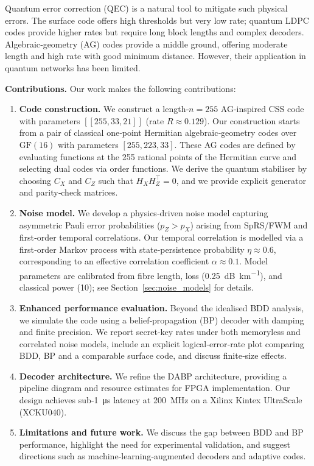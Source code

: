 \documentclass[conference]{IEEEtran}
\begin{document}
Quantum error correction (QEC) is a natural tool to mitigate such physical errors.  The surface code offers high thresholds but very low rate; quantum LDPC codes provide higher rates but require long block lengths and complex decoders.  Algebraic‑geometry (AG) codes provide a middle ground, offering moderate length and high rate with good minimum distance.  However, their application in quantum networks has been limited.

\textbf{Contributions.} Our work makes the following contributions:

\begin{enumerate}[leftmargin=*,itemsep=1pt,topsep=2pt]
  \item \textbf{Code construction.}  We construct a length‑$n=255$ AG‑inspired CSS code with parameters $[[255,33,21]]$ (rate $R\approx 0.129$).  Our construction starts from a pair of classical one‑point Hermitian algebraic‑geometry codes over $\mathrm{GF}(16)$ with parameters $[255,223,33]$.  These AG codes are defined by evaluating functions at the 255 rational points of the Hermitian curve and selecting dual codes via order functions.  We derive the quantum stabiliser by choosing $C_X$ and $C_Z$ such that $H_X H_Z^\top=0$, and we provide explicit generator and parity‑check matrices.
  \item \textbf{Noise model.}  We develop a physics‑driven noise model capturing asymmetric Pauli error probabilities ($p_Z>p_X$) arising from SpRS/FWM and first‑order temporal correlations.  Our temporal correlation is modelled via a first‑order Markov process with state‑persistence probability $\eta\approx 0.6$, corresponding to an effective correlation coefficient $\alpha\approx 0.1$.  Model parameters are calibrated from fibre length, loss (\SI{0.25}{\dB\per\kilo\meter}), and classical power (\SI{10}{\dBm}); see Section~\ref{sec:noise_models} for details.
  \item \textbf{Enhanced performance evaluation.}  Beyond the idealised BDD analysis, we simulate the code using a belief‑propagation (BP) decoder with damping and finite precision.  We report secret‑key rates under both memoryless and correlated noise models, include an explicit logical‑error‑rate plot comparing BDD, BP and a comparable surface code, and discuss finite‑size effects.
  \item \textbf{Decoder architecture.}  We refine the DABP architecture, providing a pipeline diagram and resource estimates for FPGA implementation.  Our design achieves sub‑\SI{1}{\micro\second} latency at \SI{200}{\mega\hertz} on a Xilinx Kintex UltraScale (XCKU040).
  \item \textbf{Limitations and future work.}  We discuss the gap between BDD and BP performance, highlight the need for experimental validation, and suggest directions such as machine‑learning‑augmented decoders and adaptive codes.
\end{enumerate}
\end{document}
